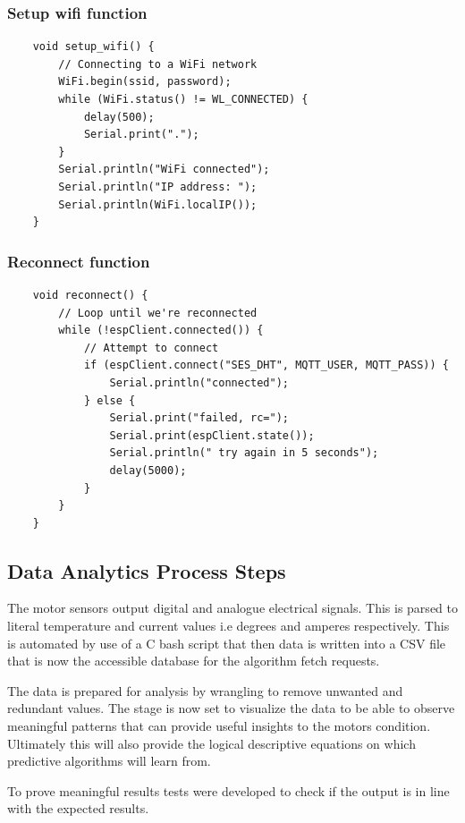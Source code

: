 \subsubsection{Setup wifi function}

\begin{lstlisting}
	void setup_wifi() {
		// Connecting to a WiFi network
		WiFi.begin(ssid, password);
		while (WiFi.status() != WL_CONNECTED) {
			delay(500);
			Serial.print(".");
		}
		Serial.println("WiFi connected");
		Serial.println("IP address: ");
		Serial.println(WiFi.localIP());
	}
\end{lstlisting}

\subsubsection{Reconnect function}

\begin{lstlisting}
	void reconnect() {
		// Loop until we're reconnected
		while (!espClient.connected()) {
			// Attempt to connect
			if (espClient.connect("SES_DHT", MQTT_USER, MQTT_PASS)) {
				Serial.println("connected");
			} else {
				Serial.print("failed, rc=");
				Serial.print(espClient.state());
				Serial.println(" try again in 5 seconds");
				delay(5000);
			}
		}
	}
\end{lstlisting}
	

\subsection{Data Analytics Process Steps}

The motor sensors output digital and analogue electrical signals. This is parsed to literal temperature and current values i.e degrees and amperes respectively. 
This is automated by use of a C bash script that then data is written into a CSV file that is now the accessible database for the algorithm fetch requests. 

The data is prepared for analysis by wrangling to remove unwanted and redundant values. The stage is now set to visualize the data to be able to observe meaningful patterns that can provide useful insights to the motors condition. Ultimately this will also provide the logical descriptive equations on which predictive algorithms will learn from.

To prove meaningful results tests were developed to check if the output is in line with the expected results.


